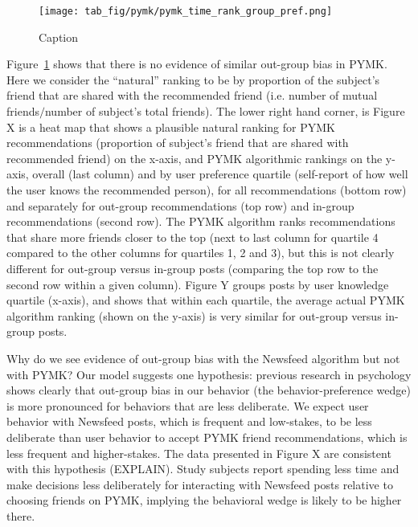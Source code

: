 \documentclass[12pt,letterpaper]{article}
\begin{document}
\begin{figure}[h]
    \centering
    \texttt{[image: tab\_fig/pymk/pymk\_time\_rank\_group\_pref.png]}
    \caption{Caption}
    \label{fig:pymk_time_pref_group}
\end{figure}

Figure~\ref{fig:pymk_time_pref_group} shows that there is no evidence of similar out-group bias in PYMK. Here we consider the ``natural'' ranking to be by proportion of the subject's friend that are shared with the recommended friend (i.e. number of mutual friends$/$number of subject's total friends). The lower right hand corner, is  Figure X is a heat map that shows a plausible natural ranking for PYMK recommendations (proportion of subject's friend that are shared with recommended friend) on the x-axis, and PYMK algorithmic rankings on the y-axis, overall (last column) and by user preference quartile (self-report of how well the user knows the recommended person), for all recommendations (bottom row) and separately for out-group recommendations (top row) and in-group recommendations (second row). The PYMK algorithm ranks recommendations that share more friends closer to the top (next to last column for quartile 4 compared to the other columns for quartiles 1, 2 and 3), but this is not clearly different for out-group versus in-group posts (comparing the top row to the second row within a given column). Figure Y groups posts by user knowledge quartile (x-axis), and shows that within each quartile, the average actual PYMK algorithm ranking (shown on the y-axis) is very similar for out-group versus in-group posts.

Why do we see evidence of out-group bias with the Newsfeed algorithm but not with PYMK? Our model suggests one hypothesis: previous research in psychology shows clearly that out-group bias in our behavior (the behavior-preference wedge) is more pronounced for behaviors that are less deliberate. We expect user behavior with Newsfeed posts, which is frequent and low-stakes, to be less deliberate than user behavior to accept PYMK friend recommendations, which is less frequent and higher-stakes. The data presented in Figure X are consistent with this hypothesis (EXPLAIN). Study subjects report spending less time and make decisions less deliberately for interacting with Newsfeed posts relative to choosing friends on PYMK, implying the behavioral wedge is likely to be higher there.
\end{document}
